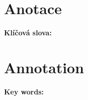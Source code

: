 ﻿\section*{Anotace\label{abstract}}



\vspace{1cm}

\noindent\textbf{\bf Klíčová slova\?:} 

\vfill


\section*{Annotation}



\vspace{1cm}

\noindent\textbf{Key words\?:} 

\vglue 1cm
